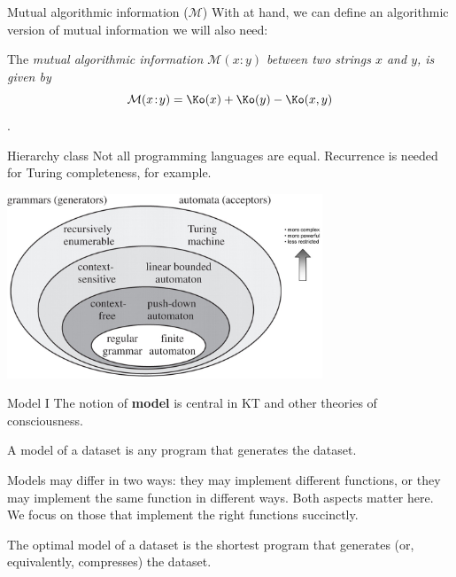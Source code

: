 \begin{frame}[label=intro3]{Mutual algorithmic information ($\mathcal M$)}
With 
\K at hand, we can define an algorithmic version of mutual information we will also need: \vfill

\begin{definition}
The {\em mutual algorithmic information  $\mathcal M(x:y)$ between two strings $x$ and $y$, is given by  }
$$
\mathcal M(x \!:\!y) = \Ko(x) +\Ko(y)- \Ko(x,y)
$$
\citep{Li:1997aa, Grunwald:2004aa}.  
\end{definition}
\end{frame}

\begin{frame}[label=ladila]{Hierarchy class \citep{Fitch2014}}
Not all programming languages are equal. Recurrence is needed for Turing completeness, for example. 
 \begin{center}%
  \includegraphics[height=5.5cm]{img/chomsky.jpg}
  \end{center}
\end{frame}

\begin{frame}[label=ladila]{Model I}
The notion of {\bf model} is central in KT and other theories of consciousness. \vfill

 
 \begin{definition}[Model]
 A  model  of a dataset is any program that generates the dataset. 
 \end{definition}
Models may differ in two ways: they may implement different functions, or they may implement the same function in different ways. Both aspects matter here.  We focus on those that implement the right functions succinctly. \vfill 
 
\begin{definition}
The optimal model of a dataset is the shortest program that generates (or, equivalently, compresses) the dataset.
\end{definition}
\end{frame}


